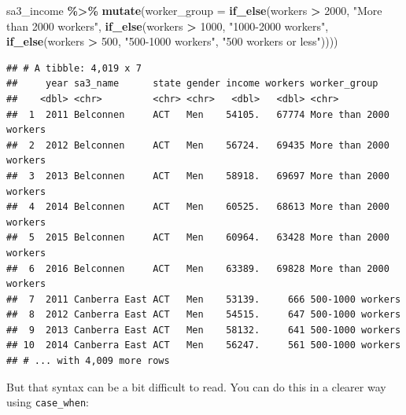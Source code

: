 \documentclass[
]{book}
\newenvironment{Shaded}{\begin{snugshade}}{\end{snugshade}}
\newcommand{\DataTypeTok}[1]{\textcolor[rgb]{0.13,0.29,0.53}{#1}}
\newcommand{\DecValTok}[1]{\textcolor[rgb]{0.00,0.00,0.81}{#1}}
\newcommand{\KeywordTok}[1]{\textcolor[rgb]{0.13,0.29,0.53}{\textbf{#1}}}
\newcommand{\NormalTok}[1]{#1}
\newcommand{\OperatorTok}[1]{\textcolor[rgb]{0.81,0.36,0.00}{\textbf{#1}}}
\newcommand{\StringTok}[1]{\textcolor[rgb]{0.31,0.60,0.02}{#1}}
\begin{document}
\begin{Shaded}
\begin{Highlighting}[]
\NormalTok{sa3\_income }\OperatorTok{\%\textgreater{}\%}\StringTok{ }
\StringTok{  }\KeywordTok{mutate}\NormalTok{(}\DataTypeTok{worker\_group =} \KeywordTok{if\_else}\NormalTok{(workers }\OperatorTok{\textgreater{}}\StringTok{ }\DecValTok{2000}\NormalTok{, }\StringTok{"More than 2000 workers"}\NormalTok{, }
                                \KeywordTok{if\_else}\NormalTok{(workers }\OperatorTok{\textgreater{}}\StringTok{ }\DecValTok{1000}\NormalTok{, }\StringTok{"1000{-}2000 workers"}\NormalTok{,}
                                        \KeywordTok{if\_else}\NormalTok{(workers }\OperatorTok{\textgreater{}}\StringTok{ }\DecValTok{500}\NormalTok{, }\StringTok{"500{-}1000 workers"}\NormalTok{,}
                                                \StringTok{"500 workers or less"}\NormalTok{))))}
\end{Highlighting}
\end{Shaded}

\begin{verbatim}
## # A tibble: 4,019 x 7
##     year sa3_name      state gender income workers worker_group          
##    <dbl> <chr>         <chr> <chr>   <dbl>   <dbl> <chr>                 
##  1  2011 Belconnen     ACT   Men    54105.   67774 More than 2000 workers
##  2  2012 Belconnen     ACT   Men    56724.   69435 More than 2000 workers
##  3  2013 Belconnen     ACT   Men    58918.   69697 More than 2000 workers
##  4  2014 Belconnen     ACT   Men    60525.   68613 More than 2000 workers
##  5  2015 Belconnen     ACT   Men    60964.   63428 More than 2000 workers
##  6  2016 Belconnen     ACT   Men    63389.   69828 More than 2000 workers
##  7  2011 Canberra East ACT   Men    53139.     666 500-1000 workers      
##  8  2012 Canberra East ACT   Men    54515.     647 500-1000 workers      
##  9  2013 Canberra East ACT   Men    58132.     641 500-1000 workers      
## 10  2014 Canberra East ACT   Men    56247.     561 500-1000 workers      
## # ... with 4,009 more rows
\end{verbatim}

But that syntax can be a bit difficult to read. You can do this in a clearer way using \texttt{case\_when}:
\end{document}
